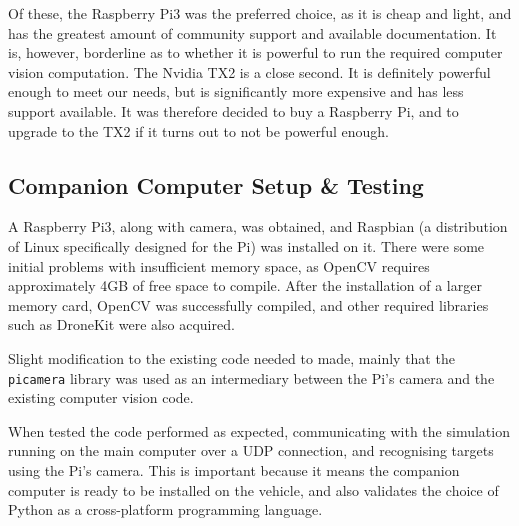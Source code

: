 \documentclass[11pt]{article}
\begin{document}
Of these, the Raspberry Pi3 was the preferred choice, as it is cheap and light, and has the greatest amount of community support and available documentation. It is, however, borderline as to whether it is powerful to run the required computer vision computation\cite{companion_computer_power}. The Nvidia TX2 is a close second. It is definitely powerful enough to meet our needs, but is significantly more expensive and has less support available. It was therefore decided to buy a Raspberry Pi, and to upgrade to the TX2 if it turns out to not be powerful enough.


\subsection{Companion Computer Setup \& Testing}
A Raspberry Pi3, along with camera, was obtained, and Raspbian (a distribution of Linux specifically designed for the Pi) was installed on it. There were some initial problems with insufficient memory space, as OpenCV requires approximately 4GB of free space to compile. After the installation of a larger memory card, OpenCV was successfully compiled, and other required libraries such as DroneKit were also acquired.

Slight modification to the existing code needed to made, mainly that the \lstinline|picamera| library was used as an intermediary between the Pi's camera and the existing computer vision code.

When tested the code performed as expected, communicating with the simulation running on the main computer over a UDP connection, and recognising targets using the Pi's camera. This is important because it means the companion computer is ready to be installed on the vehicle, and also validates the choice of Python as a cross-platform programming language.
\end{document}

